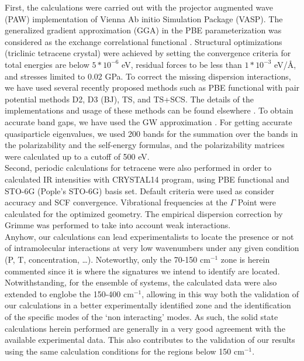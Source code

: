First, the calculations were carried out with the projector augmented wave (PAW) implementation of Vienna Ab initio Simulation Package (VASP)\cite{kresse1996efficient}. The generalized gradient approximation (GGA) in the PBE parameterization was considered as the exchange correlational functional \cite{perdew1996generalized}. Structural optimizations (triclinic tetracene crystal) were achieved by setting the convergence criteria for total energies are below $5*10^{-6}$ eV, residual forces to be less than $1*10^{-3}$ eV/Å, and stresses limited to 0.02 GPa. To correct the missing dispersion interactions, we have used several recently proposed methods such as PBE functional with pair potential methods D2, D3 (BJ), TS, and TS+SCS. The details of the implementations and usage of these methods can be found elsewhere \cite{grimme2006semiempirical,grimme2011effect,tkatchenko2009accurate,tkatchenko2012accurate,dion2004van}. To obtain accurate band gaps, we have used the GW approximation \cite{bowman2008variational}.  For getting accurate quasiparticle eigenvalues, we used 200 bands for the summation over the bands in the polarizability and the self-energy formulas, and the polarizability matrices were calculated up to a cutoff  of 500 eV.\\ 

Second, periodic calculations for tetracene were also performed in order to calculated IR intensities with CRYSTAL14 program\cite{dovesi2014crystal14}, using PBE functional and STO-6G (Pople's STO-6G) basis set. Default criteria were used as consider accuracy and SCF convergence. Vibrational frequencies at the $\Gamma$ Point were calculated for the optimized geometry. The empirical dispersion correction by Grimme \cite{grimme2006semiempirical} was performed to take into account weak interactions. \\

Anyhow, our calculations can lead experimentalists to locate the presence or not of intramolecular interactions at very low wavenumbers under any given condition (P, T, concentration, …). Noteworthy, only the 70-150 cm$^{-1}$ zone is herein commented since it is where the signatures we intend to identify are located. Notwithstanding, for the ensemble of systems, the calculated data were also extended to englobe the 150-400 cm$^{-1}$, allowing in this way both the validation of our calculations in a better experimentally identified zone and the identification of the specific modes of the ‘non interacting’ modes. As such, the solid state calculations herein performed are generally in a very good agreement with the available experimental data. This also contributes to the validation of our results using the same calculation conditions for the regions below 150 cm$^{-1}$.\\




